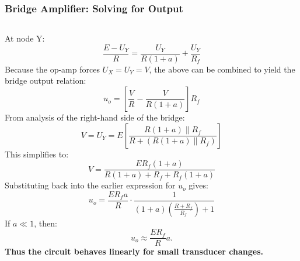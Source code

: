 \begin{frame}
	\frametitle{Bridge Amplifier: Solving for Output}
	\begin{columns}
			At node Y:
			\begin{equation}
				\frac{E - U_Y}{R} = \frac{U_Y}{R(1+a)} + \frac{U_Y}{R_f}
			\end{equation}
			Because the op-amp forces \(U_X = U_Y = V\), the above can be combined to yield the bridge output relation:
			\begin{equation}
				u_o = \left[ \frac{V}{R} - \frac{V}{R(1+a)} \right] R_f
			\end{equation}
			From analysis of the right-hand side of the bridge:
			\begin{equation}
				V = U_Y = E \left[ \frac{R(1+a) \parallel R_f}{R + (R(1+a) \parallel R_f)} \right]
			\end{equation}
			This simplifies to:
			\begin{equation}
				V = \frac{E R_f (1+a)}{R(1+a) + R_f + R_f(1+a)}
			\end{equation}
			Substituting back into the earlier expression for \(u_o\) gives:
			\begin{equation}
				u_o = \frac{E R_f a}{R} \cdot \frac{1}{(1+a)\left( \frac{R + R_f}{R_f} \right) + 1}
			\end{equation}
			If \(a \ll 1\), then:
			\begin{equation}
				u_o \approx \frac{E R_f}{R} a.
			\end{equation}
			\textbf{Thus the circuit behaves linearly for small transducer changes.}
	\end{columns}
\end{frame}
